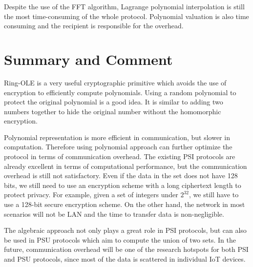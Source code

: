 \documentclass{source/Paper}
\begin{document}
    Despite the use of the FFT algorithm, Lagrange polynomial interpolation is still the most time-consuming of the whole protocol. Polynomial valuation is also time consuming and the recipient is responsible for the overhead. 

    \section{Summary and Comment }
    Ring-OLE is a very useful cryptographic primitive which avoids the use of encryption to efficiently compute polynomials. Using a random polynomial to protect the original polynomial is a good idea. It is similar to adding two numbers together to hide the original number without the homomorphic encryption.

    Polynomial representation is more efficient in communication, but slower in computation. Therefore using polynomial approach can further optimize the protocol in terms of communication overhead. The existing PSI protocols are already excellent in terms of computational performance, but the communication overhead is still not satisfactory. Even if the data in the set does not have 128 bits, we still need to use an encryption scheme with a long ciphertext length to protect privacy. For example, given a set of integers under $2^{32}$, we still have to use a 128-bit secure encryption scheme. On the other hand, the network in most scenarios will not be LAN and the time to transfer data is non-negligible.

    The algebraic approach not only plays a great role in PSI protocols, but can also be used in PSU protocols which aim to compute the union of two sets. In the future, communication overhead will be one of the research hotspots for both PSI and PSU protocols, since most of the data is scattered in individual IoT devices.


    \newpage
    
    
\end{document}
